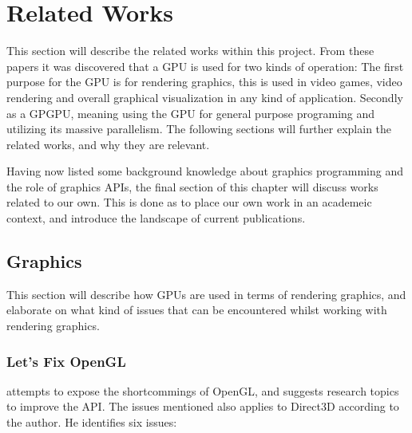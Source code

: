 \section{Related Works}\label{sec:related_works}
\begin{sectionmeta}
This section will describe the related works within this project.
From these papers it was discovered that a \gls{GPU} is used for two kinds of operation: 
The first purpose for the \gls{GPU} is for rendering graphics, this is used in video games, video rendering and overall graphical visualization in any kind of application. 
Secondly as a GP\gls{GPU}, meaning using the \gls{GPU} for general purpose programing and utilizing its massive parallelism.
The following sections will further explain the related works, and why they are relevant.
\end{sectionmeta}

Having now listed some background knowledge about graphics programming and the role of graphics \glspl{API}, the final section of this chapter will discuss works related to our own.
This is done as to place our own work in an academeic context, and introduce the landscape of current publications. 

\subsection{Graphics}
This section will describe how \glspl{GPU} are used in terms of rendering graphics, and elaborate on what kind of issues that can be encountered whilst working with rendering graphics.

\vspace{1em}

\subsubsection{Let's Fix OpenGL}

\citet{fix_opengl} attempts to expose the shortcommings of OpenGL, and suggests research topics to improve the \gls{API}. 
The issues mentioned also applies to Direct3D according to the author. 
He identifies six issues: 

